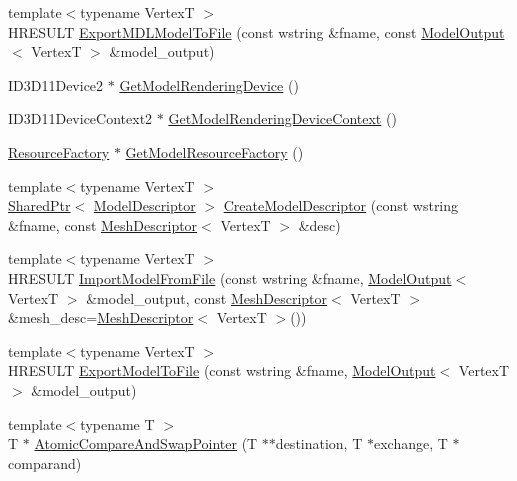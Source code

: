 \begin{DoxyCompactItemize}
\item 
{\footnotesize template$<$typename VertexT $>$ }\\H\+R\+E\+S\+U\+LT \hyperlink{namespacemage_a111dc6972bce8645df185fa5a65f9bff}{Export\+M\+D\+L\+Model\+To\+File} (const wstring \&fname, const \hyperlink{structmage_1_1_model_output}{Model\+Output}$<$ VertexT $>$ \&model\+\_\+output)
\item 
I\+D3\+D11\+Device2 $\ast$ \hyperlink{namespacemage_aca16dcb4637f074bb6e33d4ba7929686}{Get\+Model\+Rendering\+Device} ()
\item 
I\+D3\+D11\+Device\+Context2 $\ast$ \hyperlink{namespacemage_a1d373a08e09ec19944bf23feb4688b7e}{Get\+Model\+Rendering\+Device\+Context} ()
\item 
\hyperlink{classmage_1_1_resource_factory}{Resource\+Factory} $\ast$ \hyperlink{namespacemage_a51b4df46661a9038c0d2a14cb3fbe483}{Get\+Model\+Resource\+Factory} ()
\item 
{\footnotesize template$<$typename VertexT $>$ }\\\hyperlink{namespacemage_a1e01ae66713838a7a67d30e44c67703e}{Shared\+Ptr}$<$ \hyperlink{classmage_1_1_model_descriptor}{Model\+Descriptor} $>$ \hyperlink{namespacemage_a8cc26f80d3cb6f3d457bb06942880d84}{Create\+Model\+Descriptor} (const wstring \&fname, const \hyperlink{structmage_1_1_mesh_descriptor}{Mesh\+Descriptor}$<$ VertexT $>$ \&desc)
\item 
{\footnotesize template$<$typename VertexT $>$ }\\H\+R\+E\+S\+U\+LT \hyperlink{namespacemage_abc1dfdc85895f4f5fcb6acf5fafd7e27}{Import\+Model\+From\+File} (const wstring \&fname, \hyperlink{structmage_1_1_model_output}{Model\+Output}$<$ VertexT $>$ \&model\+\_\+output, const \hyperlink{structmage_1_1_mesh_descriptor}{Mesh\+Descriptor}$<$ VertexT $>$ \&mesh\+\_\+desc=\hyperlink{structmage_1_1_mesh_descriptor}{Mesh\+Descriptor}$<$ VertexT $>$())
\item 
{\footnotesize template$<$typename VertexT $>$ }\\H\+R\+E\+S\+U\+LT \hyperlink{namespacemage_a649e8c5136fa1a868d5b7441e4d041f0}{Export\+Model\+To\+File} (const wstring \&fname, \hyperlink{structmage_1_1_model_output}{Model\+Output}$<$ VertexT $>$ \&model\+\_\+output)
\item 
{\footnotesize template$<$typename T $>$ }\\T $\ast$ \hyperlink{namespacemage_aed89242e67231f3ddef77bdc63b32b6c}{Atomic\+Compare\+And\+Swap\+Pointer} (T $\ast$$\ast$destination, T $\ast$exchange, T $\ast$comparand)
$$
\end{DoxyCompactItemize}
